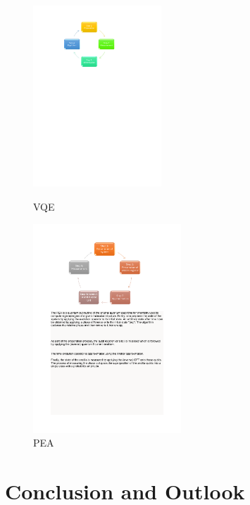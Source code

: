 \documentclass[14pt,landscape,color=UCLdarkred,margin=3cm]{uclposter}
\begin{document}
\begin{multicols}{3}
\begin{figure}[H]
  \begin{center}
  \begin{minipage}[c]{15em}
    \includegraphics[width=13em]{VQEdiagram.pdf}
    \caption{VQE}
  \end{minipage}
  \qquad
  \begin{minipage}[c]{15em}
    \includegraphics[width=15em]{PEA.pdf}
    \caption{PEA}
  \end{minipage}
  \end{center}

   
\end{figure}



\columnbreak

\section*{Conclusion and Outlook}


\end{multicols}
\end{document}
